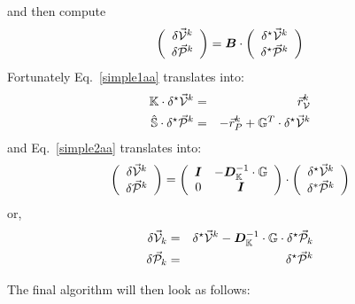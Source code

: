 and then compute
\begin{equation}
\left(
\begin{array}{c}
\delta \vec{\cal V}^k \\ 
\delta \vec{\cal P}^k
\end{array}
\right)
=
{\bm B} \cdot 
\left(
\begin{array}{c}
\delta^\star \vec{\cal V}^k \\ 
\delta^\star \vec{\cal P}^k
\end{array}
\right)
\label{simple2aa}
\end{equation}
Fortunately Eq.~\eqref{simple1aa} translates into:
\begin{eqnarray}
{\mathbb{K}} \cdot \delta^\star \vec{\cal V}^k &=&  \vec{r}_{\cal V}^k   \\
\hat{{\mathbb{S}}} \cdot  \delta^\star \vec{\cal P}^k &=&  - \vec{r}_P^k + {\mathbb{G}}^T \cdot \delta^\star \vec{\cal V}^k 
\end{eqnarray}
and Eq.~\eqref{simple2aa} translates into:
\[
\left(
\begin{array}{c}
\delta \vec{\cal V}^k \\ 
\delta \vec{\cal P}^k
\end{array}
\right)
=
\left(
\begin{array}{cc}
{\bm I} & -{\bm D}_{\mathbb{K}}^{-1}\cdot {\mathbb{G}} \\
0 & {\bm I}
\end{array}
\right)
\cdot
\left(
\begin{array}{c}
\delta^\star \vec{\cal V}^k \\ 
\delta^* \vec{\cal P}^k
\end{array}
\right)
\]
or, 
\begin{eqnarray}
\delta \vec{\cal V}_k &=& \delta^\star \vec{\cal V}^k 
-{\bm D}_{\mathbb{K}}^{-1}\cdot {\mathbb{G}} \cdot\delta^\star \vec{\cal P}_k \\
\delta \vec{\cal P}_k &=& \delta^\star \vec{\cal P}^k
\end{eqnarray}


The final algorithm will then look as follows:

